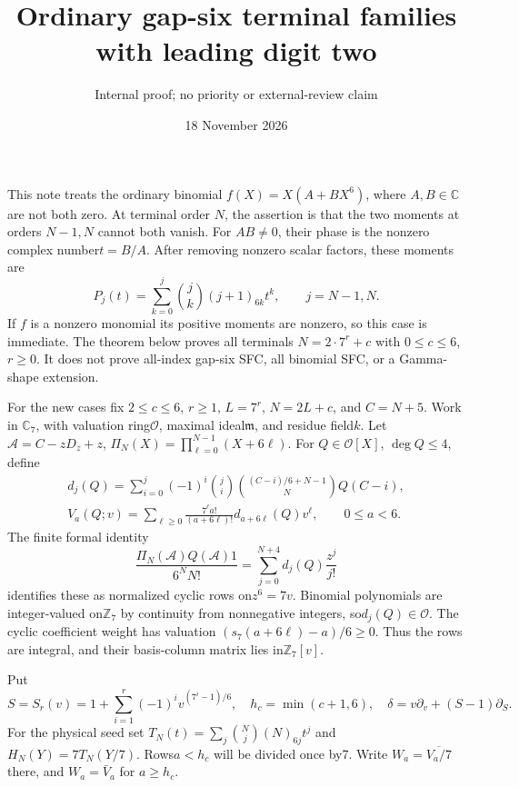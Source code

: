 \documentclass[11pt]{article}
\title{Ordinary gap-six terminal families with leading digit two}
\author{Internal proof; no priority or external-review claim}
\date{18 November 2026}
\begin{document}
\setlength{\emergencystretch}{1em}\maketitle
This note treats the ordinary binomial $f(X)=X(A+BX^6)$,
where $A,B\in\mathbb C$ are not both zero.
At terminal order $N$, the assertion is that the two moments at
orders $N-1,N$ cannot both vanish.
For $AB\ne0$, their phase is the nonzero complex number$t=B/A$.
After removing nonzero scalar factors, these moments are
\[
 P_j(t)=\sum_{k=0}^j\binom jk(j+1)_{6k}t^k,\qquad j=N-1,N.
\]
If $f$ is a nonzero monomial its positive moments are nonzero,
so this case is immediate.
The theorem below proves all terminals $N=2\cdot7^r+c$ with
$0\le c\le6$, $r\ge0$. It does not prove all-index gap-six SFC,
all binomial SFC, or a Gamma-shape extension.

For the new cases fix $2\le c\le6$, $r\ge1$, $L=7^r$,
$N=2L+c$, and $C=N+5$.
Work in $\mathbb C_7$, with valuation ring$\mathcal O$,
maximal ideal$\mathfrak m$, and residue field$k$.
Let $\mathcal A=C-zD_z+z$,
$\Pi_N(X)=\prod_{\ell=0}^{N-1}(X+6\ell)$.
For $Q\in\mathcal O[X]$, $\deg Q\le4$, define
\[
 \begin{gathered}
 d_j(Q)=\sum_{i=0}^j(-1)^i\binom ji
       \binom{(C-i)/6+N-1}{N}Q(C-i),\\
 V_a(Q;v)=\sum_{\ell\ge0}\frac{7^\ell a!}{(a+6\ell)!}
                 d_{a+6\ell}(Q)v^\ell,\qquad0\le a<6.
 \end{gathered}                                                \tag{1}
\]
The finite formal identity
\[
 \frac{\Pi_N(\mathcal A)Q(\mathcal A)1}{6^NN!}
       =\sum_{j=0}^{N+4}d_j(Q)\frac{z^j}{j!}
\]
identifies these as normalized cyclic rows on$z^6=7v$.
Binomial polynomials are integer-valued on$\mathbb Z_7$ by
continuity from nonnegative integers, so$d_j(Q)\in\mathcal O$.
The cyclic coefficient weight has valuation
$(s_7(a+6\ell)-a)/6\ge0$.
Thus the rows are integral, and their basis-column matrix lies
in$\mathbb Z_7[v]$.

Put
\[
 S=S_r(v)=1+\sum_{i=1}^r(-1)^iv^{(7^i-1)/6},\quad
 h_c=\min(c+1,6),\quad
 \delta=v\partial_v+(S-1)\partial_S.
\]
For the physical seed set
$T_N(t)=\sum_j\binom Nj(N)_{6j}t^j$ and $H_N(Y)=7T_N(Y/7)$.
Rows$a<h_c$ will be divided once by7.
Write $W_a=\overline{V_a/7}$ there, and $W_a=\bar V_a$ for
$a\ge h_c$.
\end{document}
